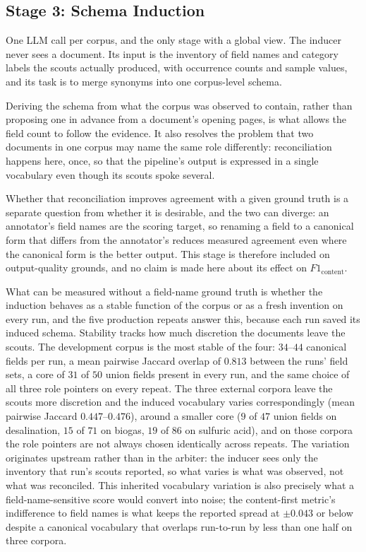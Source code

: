 \documentclass[11pt]{article}
\begin{document}
\subsection{Stage 3: Schema Induction}
\label{sec:stage_induce}
One LLM call per corpus, and the only stage with a global view. The inducer never
sees a document. Its input is the inventory of field names and category labels
the scouts actually produced, with occurrence counts and sample values, and its
task is to merge synonyms into one corpus-level schema.

Deriving the schema from what the corpus was observed to contain, rather than
proposing one in advance from a document's opening pages, is what allows the
field count to follow the evidence. It also resolves the problem that two
documents in one corpus may name the same role differently: reconciliation
happens here, once, so that the pipeline's output is expressed in a single
vocabulary even though its scouts spoke several.

Whether that reconciliation improves agreement with a given ground truth is a
separate question from whether it is desirable, and the two can diverge: an
annotator's field names are the scoring target, so renaming a field to a
canonical form that differs from the annotator's reduces measured agreement even
where the canonical form is the better output. This stage is therefore included
on output-quality grounds, and no claim is made here about its effect on
$F1_{\text{content}}$.

What can be measured without a field-name ground truth is whether the induction
behaves as a stable function of the corpus or as a fresh invention on every run,
and the five production repeats answer this, because each run saved its induced
schema. Stability tracks how much discretion the documents leave the scouts. The
development corpus is the most stable of the four: $34$--$44$ canonical fields
per run, a mean pairwise Jaccard overlap of $0.813$ between the runs' field
sets, a core of $31$ of $50$ union fields present in every run, and the same
choice of all three role pointers on every repeat. The three external corpora
leave the scouts more discretion and the induced vocabulary varies
correspondingly (mean pairwise Jaccard $0.447$--$0.476$), around a smaller core
($9$ of $47$ union fields on desalination, $15$ of $71$ on biogas, $19$ of $86$
on sulfuric acid), and on those corpora the role pointers are not always chosen
identically across repeats. The variation originates upstream rather than in the
arbiter: the inducer sees only the inventory that run's scouts reported, so what
varies is what was observed, not what was reconciled. This inherited vocabulary
variation is also precisely what a field-name-sensitive score would convert into
noise; the content-first metric's indifference to field names is what keeps the
reported spread at $\pm 0.043$ or below despite a canonical vocabulary that
overlaps run-to-run by less than one half on three corpora.
\end{document}
